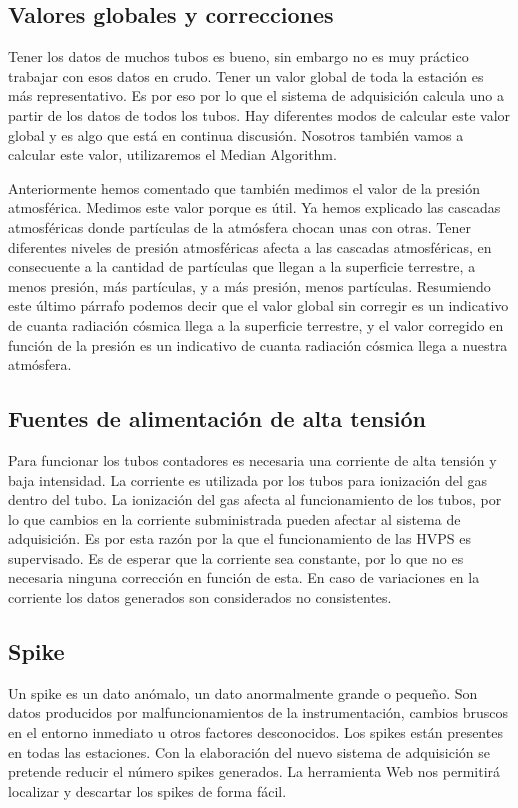 	\subsection{Valores globales y correcciones}
		Tener los datos de muchos tubos es bueno, sin embargo no es muy práctico trabajar con esos datos en crudo. Tener un valor global de toda la
		estación es más representativo. Es por eso por lo que el sistema de adquisición calcula uno a partir de los datos de todos los tubos. Hay 
		diferentes modos de calcular este valor global y es algo que está en continua discusión. Nosotros también vamos a calcular este valor, 
		utilizaremos el Median Algorithm\cite{MedianAlgr}.
		\par
		Anteriormente hemos comentado que también medimos el valor de la presión atmosférica. Medimos este valor porque es útil. Ya hemos explicado
		las cascadas atmosféricas donde partículas de la atmósfera chocan unas con otras. Tener diferentes niveles de presión atmosféricas afecta a
		las cascadas atmosféricas, en consecuente a la cantidad de partículas que llegan a la superficie terrestre, a menos presión, más partículas,
		y a más presión, menos partículas. Resumiendo este último párrafo  podemos decir que el valor global sin corregir es un indicativo de cuanta
		radiación cósmica llega a la superficie terrestre, y el valor corregido en función de la presión es un indicativo de cuanta radiación cósmica
		llega a nuestra atmósfera.
	\subsection{Fuentes de alimentación de alta tensión}
		Para funcionar los tubos contadores es necesaria una corriente de alta tensión y baja intensidad. La corriente es utilizada por los tubos
		para ionización del gas dentro del tubo. La ionización del gas afecta al funcionamiento de los tubos, por lo que cambios en la corriente
		subministrada pueden afectar al sistema de adquisición. Es por esta razón por la que el funcionamiento de las HVPS es supervisado. Es de esperar
		que la corriente sea constante, por lo que no es necesaria ninguna corrección en función de esta. En caso de variaciones en la corriente los datos
		generados son considerados no consistentes.
	\subsection{Spike}
		Un spike es un dato anómalo, un dato anormalmente grande o pequeño. Son datos producidos por malfuncionamientos de la instrumentación, cambios
		bruscos en el entorno inmediato u otros factores desconocidos. Los spikes están presentes en todas las estaciones. Con la elaboración del nuevo
		sistema de adquisición se pretende reducir el número spikes generados. La herramienta Web nos permitirá localizar y descartar los spikes de
		forma fácil.  
